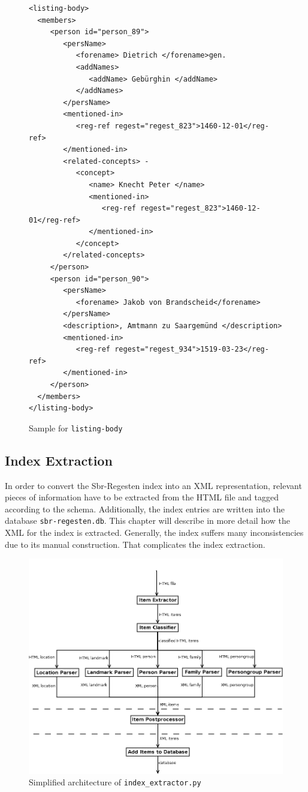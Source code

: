 \begin{figure}[H]
\centering
\begin{verbatim}
<listing-body>
  <members>
     <person id="person_89">
        <persName>
           <forename> Dietrich </forename>gen.
           <addNames>
              <addName> Gebürghin </addName>
           </addNames>
        </persName>
        <mentioned-in>
           <reg-ref regest="regest_823">1460-12-01</reg-ref>
        </mentioned-in>
        <related-concepts> -
           <concept>
              <name> Knecht Peter </name>
              <mentioned-in>
                 <reg-ref regest="regest_823">1460-12-01</reg-ref>
              </mentioned-in>
           </concept>
        </related-concepts>
     </person>
     <person id="person_90">
        <persName>
           <forename> Jakob von Brandscheid</forename>
        </persName>
        <description>, Amtmann zu Saargemünd </description>
        <mentioned-in>
           <reg-ref regest="regest_934">1519-03-23</reg-ref>
        </mentioned-in>
     </person>
  </members>
</listing-body>
\end{verbatim}
\caption{Sample for \texttt{listing-body}}
\label{fig:listing-body-xml}
\end{figure}

\subsection{Index Extraction}
In order to convert the Sbr-Regesten index into an XML representation,
relevant pieces of information have to be extracted from the HTML file
and tagged according to the schema. Additionally, the index entries
are written into the database \texttt{sbr-regesten.db}. This chapter
will describe in more detail how the XML for the index is extracted.
Generally, the index suffers many inconsistencies due to its manual
construction. That complicates the index extraction.

\begin{figure}[h]
  \centering
  \includegraphics[scale=0.5]{img/index-extractor}
  \caption{Simplified architecture of \texttt{index\_extractor.py}}
  \label{fig:index-extractor}
\end{figure}

